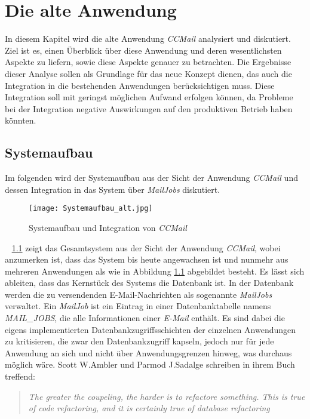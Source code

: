 \chapter{Die alte Anwendung}
\label{cha:ccmail}
In diesem Kapitel wird die alte Anwendung \emph{CCMail} analysiert und diskutiert. Ziel ist es, einen Überblick über diese Anwendung und deren wesentlichsten Aspekte zu liefern, sowie diese Aspekte genauer zu betrachten. Die Ergebnisse dieser Analyse sollen als Grundlage für das neue Konzept dienen, das auch die Integration in die bestehenden Anwendungen berücksichtigen muss. Diese Integration soll mit geringst möglichen Aufwand erfolgen können, da Probleme bei der Integration negative Auswirkungen auf den produktiven Betrieb haben könnten. 

\section{Systemaufbau}
\label{sec:ccmail-systemaufbau}
Im folgenden wird der Systemaufbau aus der Sicht der Anwendung \emph{CCMail} und dessen Integration in das System über \emph{MailJobs} diskutiert. 
\begin{figure}[h]
\centering
\texttt{[image: Systemaufbau\_alt.jpg]} %
\caption{Systemaufbau und Integration von \emph{CCMail}}
\label{fig:ccmail-system-und-integration}
\end{figure}
\ \newpage
{} \ref{fig:ccmail-system-und-integration} zeigt das Gesamtsystem aus der Sicht der Anwendung \emph{CCMail}, wobei anzumerken ist, dass das System bis heute angewachsen ist und nunmehr aus mehreren Anwendungen als wie in Abbildung  \ref{fig:ccmail-system-und-integration} abgebildet besteht. Es lässt sich ableiten, dass das Kernstück des Systems die Datenbank ist. In der Datenbank werden die zu versendenden E-Mail-Nachrichten als sogenannte \emph{MailJobs} verwaltet. Ein \emph{MailJob} ist ein Eintrag in einer Datenbanktabelle namens \emph{MAIL\_JOBS}, die alle Informationen einer \emph{E-Mail} enthält. Es sind dabei die eigens implementierten Datenbankzugriffsschichten der einzelnen Anwendungen zu kritisieren, die zwar den Datenbankzugriff kapseln, jedoch nur für jede Anwendung an sich und nicht über Anwendungsgrenzen hinweg, was durchaus möglich wäre. Scott W.Ambler und Parmod J.Sadalge schreiben in ihrem Buch \cite[27]{refactoreDatabase} treffend:
\begin{quote}
\emph{The greater the coupeling, the harder is to refactore something. This is true of code refactoring, and it is certainly true of database refactoring}
\end{quote}
